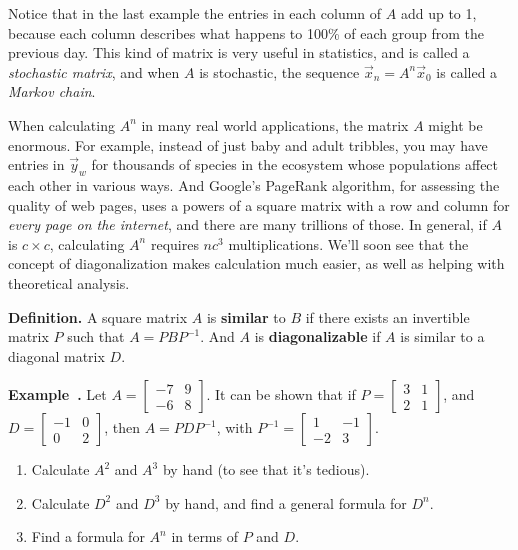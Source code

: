 \documentclass[11pt, letterpaper]{report}
\newenvironment{notes}{}{}
\newcounter{example}[section]
\newcommand{\example}{\refstepcounter{example}%
\par\noindent\textbf{Example~\theexample.} }
\newenvironment{definition}{\begin{bbox}\par\noindent\textbf{Definition. }}
  {\end{bbox}}
\newlength\oldfboxsep%
\newlength\myminiwidth%
\newenvironment{bbox}{%
  \setlength\oldfboxsep\fboxsep
  \setlength{\fboxsep}{.1in}%
  \setlength\myminiwidth\linewidth%
  \addtolength\myminiwidth{-0.2in}%
  \vspace{0.1in}%
  \begin{lrbox}{\bboxbox}\begin{minipage}{\myminiwidth}%
    }{%
    \end{minipage}\end{lrbox}%
  \noindent\fbox{\usebox{\bboxbox}}\vspace{0.1in}\setlength\fboxsep\oldfboxsep%
}
\begin{document}
Notice that in the last example the entries in each column of $A$ add up to 1, because each column describes what happens to 100\% of each group from the previous day. This kind of matrix is very useful in statistics, and is called a \emph{stochastic matrix}, and when $A$ is stochastic, the sequence $\vec{x}_n=A^n\vec{x}_0$ is called a \emph{Markov chain}.

When calculating $A^n$ in many real world applications, the matrix $A$ might be enormous. For example, instead of just baby and adult tribbles, you may have entries in $\vec{y}_w$ for thousands of species in the ecosystem whose populations affect each other in various ways. And Google's PageRank algorithm, for assessing the quality of web pages, uses a powers of a square matrix with a row and column for \emph{every page on the internet}, and there are many trillions of those. In general, if $A$ is $c\times c$, calculating $A^n$ requires $nc^3$ multiplications. We'll soon see that the concept of diagonalization makes calculation much easier, as well as helping with theoretical analysis.

\begin{definition}  
A square matrix $A$ is \textbf{similar} to $B$ if there exists an invertible matrix $P$ such that $A = PBP^{-1}$. And $A$ is \textbf{diagonalizable} if $A$ is similar to a diagonal matrix $D$.
\end{definition}

\begin{notes}
\end{notes}
\example Let $A=\begin{bmatrix}
-7 & 9 \\
-6 & 8
\end{bmatrix}$. It can be shown that if $P=\begin{bmatrix}
3 & 1 \\
2 & 1
\end{bmatrix}$, and $D=\begin{bmatrix}
-1 & 0 \\
0 & 2
\end{bmatrix}$, then $A=PDP^{-1}$, with $P^{-1}=\begin{bmatrix}
1 & -1 \\
-2 & 3
\end{bmatrix}$. 
\begin{enumerate}[label=(\alph*)]
\item Calculate $A^2$ and $A^3$ by hand (to see that it's tedious).
\item Calculate $D^2$ and $D^3$ by hand, and find a general formula for $D^n$.
\item Find a formula for $A^n$ in terms of $P$ and $D$.
\end{enumerate}
\end{document}
